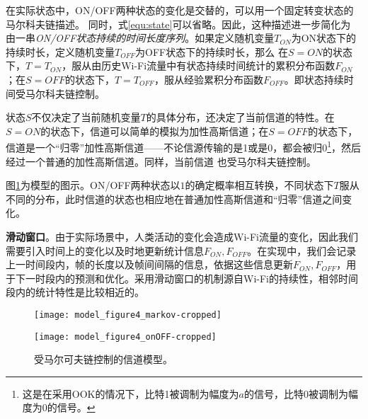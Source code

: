 在实际状态中，ON/OFF两种状态的变化是交替的，可以用一个固定转变状态的马尔科夫链描述。
同时，式\ref{equ:state}可以省略。因此，这种描述进一步简化为
由一串\emph{ON/OFF状态持续的时间长度序列}。如果定义随机变量$T_{ON}$为ON状态下的持续时长，定义随机变量$T_{OFF}$为OFF状态下的持续时长，那么
在$S = ON$的状态下，$T = T_{ON}$，服从由历史Wi-Fi流量中有状态持续时间统计的累积分布函数$F_{ON}$；在$S = OFF$的状态下，$T = T_{OFF}$，服从经验累积分布函数$F_{OFF}$。即状态持续时间受马尔科夫链控制。

状态$S$不仅决定了当前随机变量$T$的具体分布，还决定了当前信道的特性。在$S = ON$的状态下，信道可以简单的模拟为加性高斯信道；在$S = OFF$的状态下，信道是一个“归零”加性高斯信道——不论信源传输的是1或是0，都会被归0\footnote{这是在采用OOK的情况下，比特1被调制为幅度为$a$的信号，比特0被调制为幅度为0的信号。}，然后经过一个普通的加性高斯信道。同样，当前信道
也受马尔科夫链控制。

图\ref{fig:markov_model}为模型的图示。ON/OFF两种状态以$1$的确定概率相互转换，不同状态下$T$服从不同的分布，此时信道的状态也相应地在普通加性高斯信道和“归零”信道之间变化。

\textbf{滑动窗口}。由于实际场景中，人类活动的变化会造成Wi-Fi流量的变化，因此我们需要引入时间上的变化以及时地更新统计信息$F_{ON},F_{OFF}$。在实现中，我们会记录上一时间段内，帧的长度以及帧间间隔的信息，依据这些信息更新$F_{ON},F_{OFF}$，用于下一时段内的预测和优化。采用滑动窗口的机制源自Wi-Fi的持续性，相邻时间段内的统计特性是比较相近的。
\begin{figure}[t]
	\begin{minipage}[b]{.5\linewidth}
		\texttt{[image: model\_figure4\_markov-cropped]}
		\label{fig:markov_chain}
	\end{minipage}
	\hfill
	\begin{minipage}[b]{.5\linewidth}
		\texttt{[image: model\_figure4\_onOFF-cropped]}
		\label{fig:series}
	\end{minipage}
	\caption{受马尔可夫链控制的信道模型。}\label{fig:markov_model}
\end{figure}